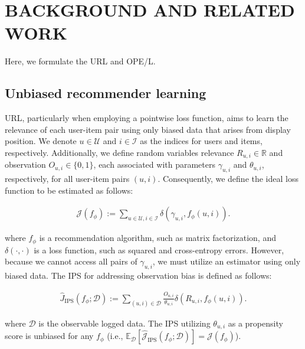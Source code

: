 \section{BACKGROUND AND RELATED WORK}
Here, we formulate the URL and OPE/L.

\subsection{Unbiased recommender learning}
URL, particularly when employing a pointwise loss function, aims to learn the relevance of each user-item pair using only biased data that arises from display position. We denote \( u \in \mathcal{U} \) and \( i \in \mathcal{I} \) as the indices for users and items, respectively. Additionally, we define random variables relevance \( R_{u,i} \in \mathbb{R} \) and observation \( O_{u,i} \in \{ 0, 1 \} \), each associated with parameters \( \gamma_{u,i} \) and \( \theta_{u,i} \), respectively, for all user-item pairs \( (u,i) \). Consequently, we define the ideal loss function to be estimated as follows:

\vspace{-5mm}
\begin{align*}
    \mathcal{J}(f_{\phi}) := \sum_{u \in \mathcal{U},i \in \mathcal{I}} \delta(\gamma_{u,i}, f_{\phi}(u,i)).
\end{align*}
\vspace{-5mm}

where \( f_{\phi} \) is a recommendation algorithm, such as matrix factorization, and \( \delta(\cdot,\cdot) \) is a loss function, such as squared and cross-entropy errors. However, because we cannot access all pairs of \( \gamma_{u,i} \), we must utilize an estimator using only biased data. The IPS for addressing observation bias \cite{schnabel2016recommendations,saito2020unbiased} is defined as follows:

\vspace{-5mm}
\begin{align}
    \hat{J}_{\text{IPS}}(f_{\phi};\mathcal{D}) := \sum_{(u,i) \in \mathcal{D}} \frac{O_{u,i}}{\theta_{u,i}} \delta(R_{u,i}, f_{\phi}(u,i)).
\end{align}
\vspace{-3mm}

where \( \mathcal{D} \) is the observable logged data. The IPS utilizing \( \theta_{u,i} \) as a propensity score is unbiased for any \( f_{\phi} \) (i.e., \( \mathbb{E}_{\mathcal{D}}[\hat{\mathcal{J}}_{\text{IPS}}(f_{\phi};\mathcal{D})] = \mathcal{J}(f_{\phi}) \)).

